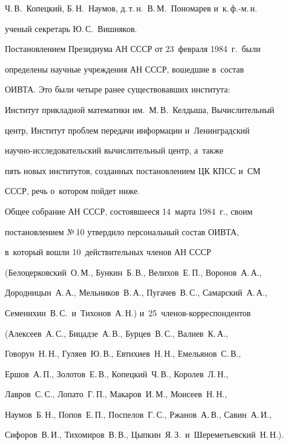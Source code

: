 Ч.\,В.~Копецкий, Б.\,Н.~Наумов, д.\,т.\,н.\ В.\,М.~Пономарев и~\mbox{к.\,ф.-м.\,н.} 

ученый секретарь Ю.\,С.~Виш\-ня\-ков.

   

   Постановлением Президиума АН СССР от 23~февраля 1984~г.\ были 

определены научные учреж\-де\-ния АН \mbox{СССР}, во\-шед\-шие в~со\-став 

\mbox{ОИВТА}. Это были четыре ранее существовавших института: 

Институт при\-клад\-ной математики им.\ М.\,В.~Келдыша, Вычислительный 

центр, Институт проб\-лем передачи информации и~Ленинградский  

на\-уч\-но-ис\-сле\-до\-ва\-тель\-ский вы\-чис\-ли\-тель\-ный центр, а~также 

пять новых институтов, созданных по\-ста\-нов\-ле\-ни\-ем ЦК КПСС и~СМ 

\mbox{СССР}, речь о~котором пойдет ниже. 

   

   Общее собрание АН СССР, состоявшееся 14~марта 1984~г., своим 

по\-ста\-нов\-ле\-ни\-ем №\,10 утвер\-ди\-ло персональный со\-став \mbox{ОИВТА}, 

в~который во\-шли 10~действительных членов АН \mbox{СССР} 

(Бе\-ло\-цер\-ков\-ский~О.\,М., Бун\-кин~Б.\,В., Ве\-ли\-хов~Е.\,П., Во\-ро\-нов~А.\,А., 

До\-род\-ни\-цын~А.\,А., Мель\-ни\-ков~В.\,А., Пугачев~В.\,С., Са\-мар\-ский~А.\,А., 

Семенихин~В.\,С.\ и~Тихонов~А.\,Н.) и~25~чле\-нов-кор\-рес\-пон\-ден\-тов 

(Алексеев~А.\,С., Би\-ца\-дзе~А.\,В., Бур\-цев~В.\,С., Валиев~К.\,А., 

Говорун~Н.\,Н., Гуляев~Ю.\,В., Ев\-ти\-хи\-ев~Н.\,Н., Емель\-я\-нов~С.\,В., 

Ер\-шов~А.\,П., Золотов~Е.\,В., Ко\-пец\-кий~Ч.\,В., Королев~Л.\,Н., 

Лавров~С.\,С., Лопато~Г.\,П., Макаров~И.\,М., Моисеев~Н.\,Н., 

Наумов~Б.\,Н., Попов~Е.\,П., Пос\-пе\-лов~Г.\,С., Ржа\-нов~А.\,В., Савин~А.\,И., 

Сифоров~В.\,И., Тихомиров~В.\,В., Цып\-кин~Я.\,З.\ и~Ше\-ре\-меть\-ев\-ский~Н.\,Н.).






